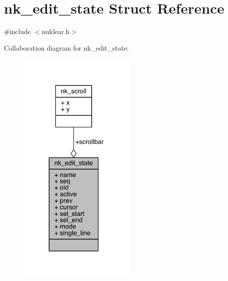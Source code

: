 \hypertarget{structnk__edit__state}{}\section{nk\+\_\+edit\+\_\+state Struct Reference}
\label{structnk__edit__state}


{\ttfamily \#include $<$nuklear.\+h$>$}



Collaboration diagram for nk\+\_\+edit\+\_\+state\+:
\nopagebreak
\begin{figure}[H]
\begin{center}
\leavevmode
\includegraphics[width=164pt]{structnk__edit__state__coll__graph}
\end{center}
\end{figure}
